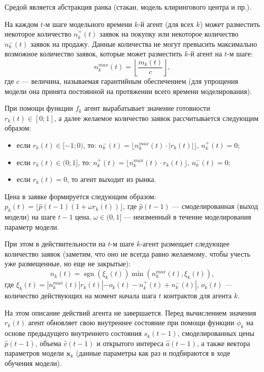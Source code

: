 \documentclass[12pt, a4paper]{extarticle}
\DeclareMathOperator{\sgn}{sgn}
\renewcommand{\vec}[1]{\mathbf{#1}}
\begin{document}
Средой является абстракция ранка (стакан, модель клирингового центра и пр.).

На каждом $t$-м шаге модельного времени $k$-й агент (для всех $k$) может разместить некоторое количество $n^+_k(t)$ 
заявок на покупку или некоторое количество $n^-_k(t)$ заявок на продажу. Данные количества не могут превысить 
максимально возможное количество заявок, которые может разместить $k$-й агент на $t$-м шаге:
\begin{equation}
    n^{max}_k(t) = \left\lfloor \frac{m_k(t)}{c} \right\rfloor,
\end{equation}
где $c$ --- величина, называемая гарантийным обеспечением (для упрощения модели она принята постоянной на
протяжении всего времени моделирования).

При помощи функции $f_k$ агент вырабатывает значение готовности $r_k(t) \in [0; 1]$, а далее желаемое количество 
заявок рассчитывается следующим образом:
\begin{itemize}
    \item если $r_k(t) \in [-1; 0)$, то: $n^-_k(t) = \lfloor n^{max}_k(t) \cdot |r_k(t)| \rfloor$, $n^+_k(t) = 0$;
    \item если $r_k(t) \in (0; 1]$, то: $n^+_k(t) = \lfloor n^{max}_k(t) \cdot r_k(t) \rfloor$, $n^-_k(t) = 0$;
    \item если $r_k(t) = 0$, то агент выходит из рынка.
\end{itemize}

Цена в заявке формируется следующим образом: $p_k(t) = \lfloor \hat{p}(t - 1) (1 + \omega r_k(t)) \rfloor$,
где $\hat{p}(t - 1)$ --- смоделированная (выход модели) на шаге $t - 1$ цена, $\omega \in (0, 1]$ --- неизменный
в течение моделирования параметр модели.

При этом в действительности на $t$-м шаге $k$-агент размещает следующее количество заявок (заметим, что оно
не всегда равно желаемому, чтобы учесть уже размещенные, но еще не закрытые):
\begin{equation}
    n_k(t) = \sgn\left(\xi_k(t)\right) \min\left(n^{max}_k(t), \xi_k(t)\right),
\end{equation}
где $\xi_k(t) = |n^{max}_k(t) |r_k(t)| - o_k(t) - n^+_k(t) + n^-_k(t)|$, $o_k(t)$ --- количество действующих
на момент начала шага $t$ контрактов для агента $k$.

На этом описание действий агента не завершается. Перед вычислением значения $r_k(t)$ агент обновляет свою внутреннее
состояние при помощи функции $\phi_k$ на основе предыдущего внутреннего состояния $s_k(t - 1)$, 
смоделированных цены $\hat{p}(t - 1)$, объема $\hat{v}(t - 1)$ и открытого интереса $\hat{a}(t - 1)$,
а также вектора параметров модели $\vec{x}_k$ (данные параметры как раз и подбираются в ходе обучения модели).
\end{document}
